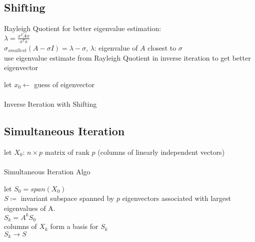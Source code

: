 \documentclass[8pt,letter]{article}
\begin{document}
\begin{multicols*}{2}
    \vfill\null
    \columnbreak
        
    \subsection{Shifting}
    Rayleigh Quotient for better eigenvalue estimation:\\
    $\lambda = \frac{x^T A x}{x^T x}$\\
    $\sigma_{smallest}(A-\sigma I) = \lambda - \sigma$, $\lambda$: eigenvalue of $A$ closest to $\sigma$\\
    use eigenvalue estimate from Rayleigh Quotient in inverse iteration to get better eigenvector\\
    
    \begin{algorithm}[H]
      let $x_0 \leftarrow$ guess of eigenvector\\
      \\
      \caption{Inverse Iteration with Shifting \label{Algo_inverse_iteration_shifting}}
    \end{algorithm}        
        
    \subsection{Simultaneous Iteration}
    
    \begin{algorithm}[H]
      let $X_0$: $n \times p$ matrix of rank $p$ (columns of linearly independent vectors)\\
      \\
      \caption{Simultaneous Iteration Algo \label{Algo_simultaneous_iteration}}
    \end{algorithm}    

    let $S_0 = span(X_0)$\\
    $S \coloneqq$ invariant subspace spanned by $p$ eigenvectors associated with largest eigenvalues of A.\\
    $S_k = A^k S_0$\\
    columns of $X_k$ form a basis for $S_k$\\
    $S_k \rightarrow S$\\


\end{multicols*}
\end{document}
